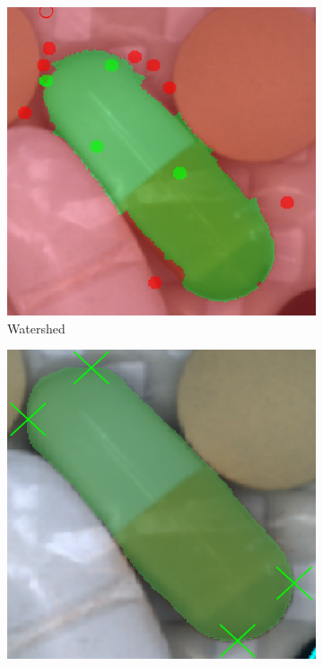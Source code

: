 	
\begin{figure} \ContinuedFloat
	\begin{subfigure}[t]{0.3\textwidth}
		\centering
		\includegraphics[width=\textwidth]{figures/appendix/method_predictions/pill56_watershed.png}
		\caption{
			Watershed
		}
	\end{subfigure}
	\hfill
	\begin{subfigure}[t]{0.3\textwidth}
		\centering
		\includegraphics[width=\textwidth]{figures/appendix/method_predictions/pill56_dextr.png}

\end{subfigure}
\end{figure}
